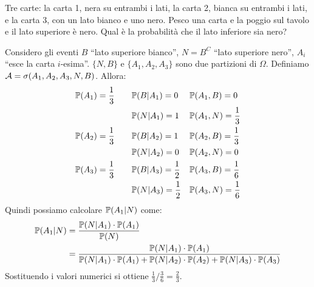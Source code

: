 \begin{ese}
Tre carte: la carta 1, nera su entrambi i lati, la carta 2,
bianca su entrambi i lati, e la carta 3, con un lato bianco e uno nero.
Pesco una carta e la poggio sul tavolo e il lato superiore è nero.
Qual è la probabilità che il lato inferiore sia nero?

Considero gli eventi $B$ ``lato superiore bianco'', $N = B^C$ ``lato superiore nero'',
$A_i$ ``esce la carta $i$-esima''. $\{N, B\}$ e $\{A_1, A_2, A_3\}$ sono due partizioni
di $\Omega$. Definiamo $\mathcal A = \sigma(A_1, A_2, A_3, N, B)$. Allora:
\begin{align*}
  &\mathbb P(A_1) = \frac 1 3 \quad
  &&\mathbb P(B | A_1) = 0 &&\mathbb P(A_1, B) = 0 \\
  &&&\mathbb P(N | A_1) = 1 &&\mathbb P(A_1, N) = \frac 1 3 \\
  &\mathbb P(A_2) = \frac 1 3 \quad
  &&\mathbb P(B | A_2) = 1 &&\mathbb P(A_2, B) = \frac 1 3 \\
  &&&\mathbb P(N | A_2) = 0 &&\mathbb P(A_2, N) = 0 \\
  &\mathbb P(A_3) = \frac 1 3 \quad
  &&\mathbb P(B | A_3) = \frac 1 2 &&\mathbb P(A_3, B) = \frac 1 6 \\
  &&&\mathbb P(N | A_3) = \frac 1 2 &&\mathbb P(A_3, N) = \frac 1 6 \\
\end{align*}
Quindi possiamo calcolare $\mathbb P(A_1|N)$ come:
\begin{align*}
  \mathbb P(A_1|N)
  &= \frac {\mathbb P(N|A_1) \cdot \mathbb P(A_1)} {\mathbb P(N)}\\
  &= \frac
  {\mathbb P(N|A_1) \cdot \mathbb P(A_1)}
  {\mathbb P(N|A_1) \cdot \mathbb P(A_1)
  + \mathbb P(N|A_2) \cdot \mathbb P(A_2)
  + \mathbb P(N|A_3) \cdot \mathbb P(A_3)}
\end{align*}
Sostituendo i valori numerici si ottiene ${\frac 1 3}/{\frac 3 6} = \frac 2 3$.
\end{ese}
\cleardoublepage
